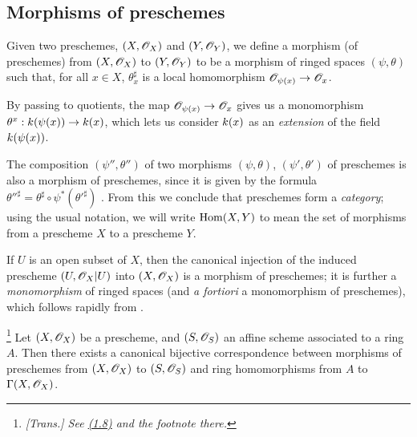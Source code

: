 \subsection{Morphisms of preschemes}
\label{subsection:I.2.2}

\begin{definition}[2.2.1]
\label{I.2.2.1}
Given two preschemes, $(X,\mathscr{O}_X)$ and $(Y,\mathscr{O}_Y)$, we define a morphism (of preschemes) from $(X,\mathscr{O}_X)$ to $(Y,\mathscr{O}_Y)$ to be a morphism of ringed spaces $(\psi,\theta)$ such that, for all $x\in X$, $\theta_x^\sharp$ is a local homomorphism $\sh{O}_{\psi(x)}\to\sh{O}_x$.
\end{definition}

By passing to quotients, the map $\sh{O}_{\psi(x)}\to\sh{O}_x$ gives us a monomorphism $\theta^x:\kres(\psi(x))\to\kres(x)$, which lets us consider $k(x)$ as an \emph{extension} of the field $k(\psi(x))$.

\begin{env}[2.2.2]
\label{I.2.2.2}
The composition $(\psi'',\theta'')$ of two morphisms $(\psi,\theta)$, $(\psi',\theta')$ of preschemes is also a morphism of preschemes, since it is given by the formula ${\theta''}^\sharp=\theta^\sharp\circ\psi^*({\theta'}^\sharp)$ .
From this we conclude that preschemes form a \emph{category};
using the usual notation, we will write $\operatorname{Hom}(X,Y)$ to mean the set of morphisms from a prescheme $X$ to a prescheme $Y$.
\end{env}

\begin{example}[2.2.3]
\label{I.2.2.3}
If $U$ is an open subset of $X$, then the canonical injection  of the induced prescheme $(U,\mathscr{O}_X|U)$ into $(X,\mathscr{O}_X)$ is a morphism of preschemes;
it is further a \emph{monomorphism} of ringed spaces (and \emph{a fortiori} a monomorphism of preschemes), which follows rapidly from .
\end{example}

\begin{proposition}[2.2.4]
\label{I.2.2.4}
\footnote{\emph{[Trans.] See \hyperref[subsection:I.1.8]{(1.8)} and the footnote there.}}
Let $(X,\mathscr{O}_X)$ be a prescheme, and $(S,\mathscr{O}_S)$ an affine scheme associated to a ring $A$.
Then there exists a canonical bijective correspondence between morphisms of preschemes from $(X,\mathscr{O}_X)$ to $(S,\mathscr{O}_S)$ and ring homomorphisms from $A$ to $\Gamma(X,\mathscr{O}_X)$.
\end{proposition}

